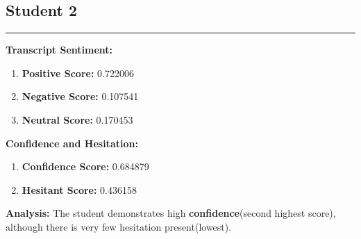 \documentclass{article}
\begin{document}
\subsection{Student 2}
\begin{center}
    \color{green}\rule{1\linewidth}{0.7mm}
\end{center}



\large{\textbf{Transcript Sentiment:}}
\begin{tcolorbox}[colback=blue!5!white,colframe=blue!75!black, fonttitle=\bfseries, title=Sentiment Breakdown]
    \begin{enumerate}
        \item \textbf{Positive Score:} \textcolor{green!70!black}{0.722006}
        \item \textbf{Negative Score:} \textcolor{red!70!black}{0.107541}
        \item \textbf{Neutral Score:} \textcolor{blue!70!black}{0.170453}
    \end{enumerate}
\end{tcolorbox}

\large{\textbf{Confidence and Hesitation:}}
\begin{tcolorbox}[colback=green!10!white, colframe=green!80!black, title=Confidence and Hesitant Scores]
    \begin{enumerate}
        \item \textbf{Confidence Score:} \textcolor{green!50!black}{0.684879}
        \item \textbf{Hesitant Score:} \textcolor{red!70!black}{0.436158}
    \end{enumerate}
\end{tcolorbox}
    \textbf{Analysis:} The student demonstrates high \textbf{confidence}(second highest score), although there is very few hesitation present(lowest).
\end{document}

